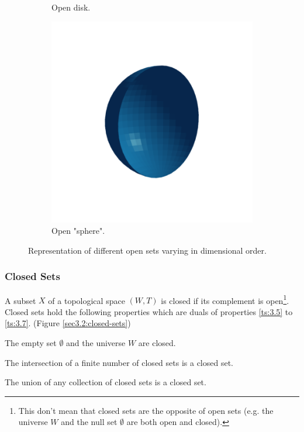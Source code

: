 \documentclass[a4paper,11pt,oneside]{article}
\begin{document}
\begin{figure}[ht]
\begin{subfigure}[b]{0.2\textwidth}
		\caption{Open disk.}
	\end{subfigure}
	\hfill
	\begin{subfigure}[b]{0.2\textwidth}
		\centering
		\includegraphics[width=\textwidth]{section3/3.2/open-sphere.png}
		\caption{Open "sphere".}
	\end{subfigure}
	\hfill
	\caption{Representation of different open sets varying in dimensional order.}
	\label{sec3.2:open-sets}
\end{figure}

   
    
\subsubsection{Closed Sets}
\begin{definition}
	A subset $X$ of a topological space $(W, T)$ is closed if its complement is open\footnote{This don't mean that closed sets are the opposite of open sets (e.g. the universe $W$ and the null set $\emptyset$ are both open and closed)\cite{mansfield_1987}.}. Closed sets hold the following properties which are duals of properties \eqref{ts:3.5} to \eqref{ts:3.7}. (Figure \ref{sec3.2:closed-sets})
				    
	\begin{property}
		The empty set $\emptyset$ and the universe $W$ are closed. \cite{mansfield_1987}
	\end{property}
	\begin{property}
		The intersection of a finite number of closed sets is a closed set. \cite{mansfield_1987}
	\end{property}
	\begin{property}
		The union of any collection of closed sets is a closed set. \cite{mansfield_1987}
	\end{property}
\end{definition}
    
\end{document}
